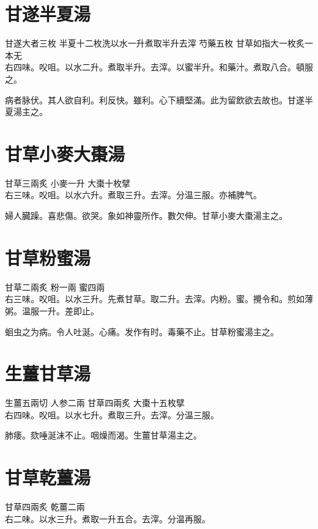 \section{甘遂半夏湯}

甘遂{\scriptsize 大者三枚} 半夏{\scriptsize 十二枚洗以水一升煮取半升去滓} 芍藥{\scriptsize 五枚} 甘草{\scriptsize 如指大一枚炙一本无}\\
右四味。㕮咀。以水二升。煮取半升。去滓。以蜜半升。和藥汁。煮取八合。頓服之。

病者脉伏。其人欲自利。利反快。雖利。心下續堅滿。此为留飲欲去故也。甘遂半夏湯主之。

\section{甘草小麥大棗湯}

甘草{\scriptsize 三兩炙} 小麥{\scriptsize 一升} 大棗{\scriptsize 十枚擘}\\
右三味。㕮咀。以水六升。煮取三升。去滓。分温三服。亦補脾气。

婦人臓躁。喜悲傷。欲哭。象如神靈所作。數欠伸。甘草小麥大棗湯主之。

\section{甘草粉蜜湯}

甘草{\scriptsize 二兩炙} 粉{\scriptsize 一兩} 蜜{\scriptsize 四兩}\\
右三味。㕮咀。以水三升。先煮甘草。取二升。去滓。内粉。蜜。攪令和。煎如薄粥。温服一升。差即止。

蛔虫之为病。令人吐涎。心痛。发作有时。毒藥不止。甘草粉蜜湯主之。

\section{生薑甘草湯}

生薑{\scriptsize 五兩切} 人参{\scriptsize 二兩} 甘草{\scriptsize 四兩炙} 大棗{\scriptsize 十五枚擘}\\
右四味。㕮咀。以水七升。煮取三升。去滓。分温三服。

肺痿。欬唾涎沫不止。咽燥而渴。生薑甘草湯主之。

\section{甘草乾薑湯}

甘草{\scriptsize 四兩炙} 乾薑{\scriptsize 二兩}\\
右二味。以水三升。煮取一升五合。去滓。分温再服。

